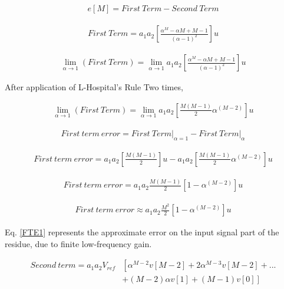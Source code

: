  
 \begin{align*}
     e[M]=First\ Term - Second\ Term
 \end{align*}
 
  
 \begin{align*}
     First\ Term = a_1a_2\left[\frac{\alpha^M-\alpha M+M-1}{\left(\alpha-1\right)^2}\right]u
 \end{align*}
 
 
 \begin{align*}
      \lim_{\alpha\to1} (First\ Term) =\lim_{\alpha\to1}a_1a_2\left[\frac{\alpha^M-\alpha M+M-1}{\left(\alpha-1\right)^2}\right]u
 \end{align*}
 
 After application of L-Hospital's Rule Two times,
 
 \begin{align*}
      \lim_{\alpha\to1} (First\ Term) =\lim_{\alpha\to1}a_1a_2\left[\frac{M(M-1)}{2}\alpha^{\left( M-2\right)}\right]u
 \end{align*}

 \begin{align*}
     First\ term\ error =\left.First\ Term\right|_{\alpha=1}-\left.First\ Term\right|_{\alpha}
 \end{align*}
 
 \begin{align*}
     First\ term\ error = a_1a_2\left[\frac{M(M-1)}{2}\right]u-a_1a_2\left[\frac{M(M-1)}{2}\alpha^{\left( M-2\right)}\right]u
 \end{align*}
 
 \begin{align*}
     First\ term\ error =a_1a_2\frac{M(M-1)}{2}\left[1-\alpha^{\left( M-2\right)}\right]u
 \end{align*}
 
  \begin{align} \label{FTE1}
     First\ term\ error \approx a_1a_2\frac{M^2}{2}\left[1-\alpha^{\left( M-2\right)}\right]u
 \end{align}
 
 Eq. \ref{FTE1} represents the approximate error on the input signal part of the residue, due to finite low-frequency gain.
  
 \begin{align*}
     Second\ term=a_1a_2V_{ref}&\left[\alpha^{M-2}v[M-2]+2\alpha^{M-3}v[M-2]+...\right.\\
                 &\left.+(M-2)\alpha v[1]+(M-1)v[0]\right]
 \end{align*}
 
